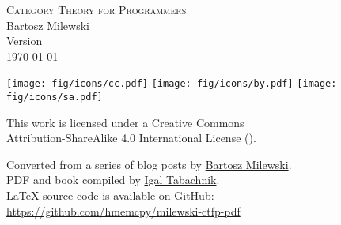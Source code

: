 \begin{small}
  \begin{center}

    \textsc{Category Theory for Programmers}\\

    \vspace{1.0em}
    \noindent
    Bartosz Milewski\\

    \vspace{1.26em}
    \noindent
    Version \texttt{\OPTversion}\\\today


    \vspace{1.6em}
    \noindent
    \texttt{[image: fig/icons/cc.pdf]}
    \texttt{[image: fig/icons/by.pdf]}
    \texttt{[image: fig/icons/sa.pdf]}

    \vspace{0.4em}
    \noindent
    This work is licensed under a Creative Commons\\
    Attribution-ShareAlike 4.0 International License
    (\href{http://creativecommons.org/licenses/by-sa/4.0/}{}).

    \vspace{1.26em}
    \noindent
    Converted from a series of blog posts by \href{https://bartoszmilewski.com/2014/10/28/category-theory-for-programmers-the-preface/}{Bartosz Milewski}.\\
    PDF and book compiled by \href{https://hmemcpy.com}{Igal Tabachnik}.\\
    \vspace{1.26em}
    \noindent
    \LaTeX{} source code is available on GitHub: \href{https://github.com/hmemcpy/milewski-ctfp-pdf}{https://github.com/hmemcpy/milewski-ctfp-pdf}
  \end{center}
\end{small}